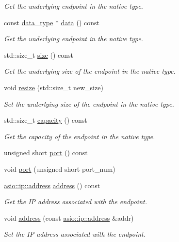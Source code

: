 \begin{DoxyCompactItemize}
\begin{DoxyCompactList}\small\item\em Get the underlying endpoint in the native type. \end{DoxyCompactList}\item 
const \hyperlink{classasio_1_1ip_1_1basic__endpoint_a080cc84bcb7c39ec426a3670b9456c44}{data\+\_\+type} $\ast$ \hyperlink{classasio_1_1ip_1_1basic__endpoint_a203ce0918c0d58ebb3065996eff6ec11}{data} () const 
\begin{DoxyCompactList}\small\item\em Get the underlying endpoint in the native type. \end{DoxyCompactList}\item 
std\+::size\+\_\+t \hyperlink{classasio_1_1ip_1_1basic__endpoint_a772068bdd2764c6381b9f8e4523c46b4}{size} () const 
\begin{DoxyCompactList}\small\item\em Get the underlying size of the endpoint in the native type. \end{DoxyCompactList}\item 
void \hyperlink{classasio_1_1ip_1_1basic__endpoint_ac76d9673c36b0087b54ff1c86a642804}{resize} (std\+::size\+\_\+t new\+\_\+size)
\begin{DoxyCompactList}\small\item\em Set the underlying size of the endpoint in the native type. \end{DoxyCompactList}\item 
std\+::size\+\_\+t \hyperlink{classasio_1_1ip_1_1basic__endpoint_a04755c1a89e36963fcfd77cf15fa36ef}{capacity} () const 
\begin{DoxyCompactList}\small\item\em Get the capacity of the endpoint in the native type. \end{DoxyCompactList}\item 
unsigned short \hyperlink{classasio_1_1ip_1_1basic__endpoint_ac556e197049878b76e2d9ea8b6ec73eb}{port} () const 
\item 
void \hyperlink{classasio_1_1ip_1_1basic__endpoint_a17616cd43109956791766f1c3b7163ad}{port} (unsigned short port\+\_\+num)
\item 
\hyperlink{classasio_1_1ip_1_1address}{asio\+::ip\+::address} \hyperlink{classasio_1_1ip_1_1basic__endpoint_a2f99403f9814d69e1164784329083709}{address} () const 
\begin{DoxyCompactList}\small\item\em Get the I\+P address associated with the endpoint. \end{DoxyCompactList}\item 
void \hyperlink{classasio_1_1ip_1_1basic__endpoint_a017a8b4674ec34904685fb198c3998bf}{address} (const \hyperlink{classasio_1_1ip_1_1address}{asio\+::ip\+::address} \&addr)
\begin{DoxyCompactList}\small\item\em Set the I\+P address associated with the endpoint. \end{DoxyCompactList}\end{DoxyCompactItemize}
